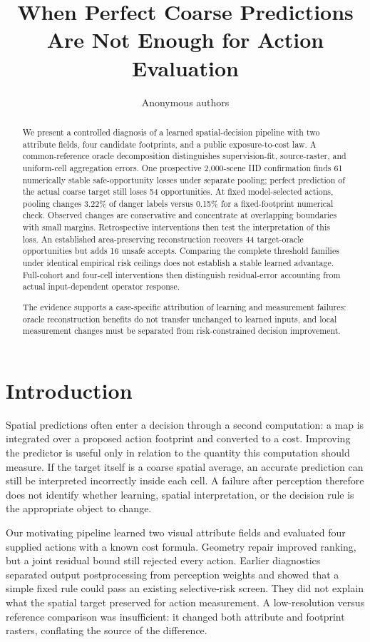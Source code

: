 \documentclass{article}
\title{When Perfect Coarse Predictions Are Not Enough for Action Evaluation}
\author{Anonymous authors}
\begin{document}
\maketitle
{}
\begin{abstract}
We present a controlled diagnosis of a learned spatial-decision pipeline with
two attribute fields, four candidate footprints, and a public exposure-to-cost
law. A common-reference oracle decomposition distinguishes supervision-fit,
source-raster, and uniform-cell aggregation errors. One prospective 2,000-scene
IID confirmation finds 61 numerically stable safe-opportunity losses under
separate pooling; perfect prediction of the actual coarse target still loses
54 opportunities. At fixed model-selected actions, pooling changes 3.22\% of
danger labels versus 0.15\% for a fixed-footprint numerical check. Observed
changes are conservative and concentrate at overlapping boundaries with small
margins. Retrospective interventions then test the interpretation of this loss.
An established area-preserving reconstruction recovers 44 target-oracle
opportunities but adds 16 unsafe accepts. Comparing the complete threshold
families under identical empirical risk ceilings does not establish a stable
learned advantage. Full-cohort and four-cell interventions then distinguish
residual-error accounting from actual input-dependent operator response.

The evidence supports a case-specific attribution of learning and measurement
failures: oracle reconstruction benefits do not transfer unchanged to learned
inputs, and local measurement changes must be separated from risk-constrained
decision improvement.
\end{abstract}

\section{Introduction}
\label{sec:intro}
Spatial predictions often enter a decision through a second computation: a map
is integrated over a proposed action footprint and converted to a cost. Improving
the predictor is useful only in relation to the quantity this computation should
measure. If the target itself is a coarse spatial average, an accurate prediction
can still be interpreted incorrectly inside each cell. A failure after perception
therefore does not identify whether learning, spatial interpretation, or the
decision rule is the appropriate object to change.

Our motivating pipeline learned two visual attribute fields and evaluated four
supplied actions with a known cost formula. Geometry repair improved ranking,
but a joint residual bound still rejected every action. Earlier diagnostics
separated output postprocessing from perception weights and showed that a simple
fixed rule could pass an existing selective-risk screen. They did not explain
what the spatial target preserved for action measurement. A low-resolution versus
reference comparison was insufficient: it changed both attribute and footprint
rasters, conflating the source of the difference.
\end{document}
